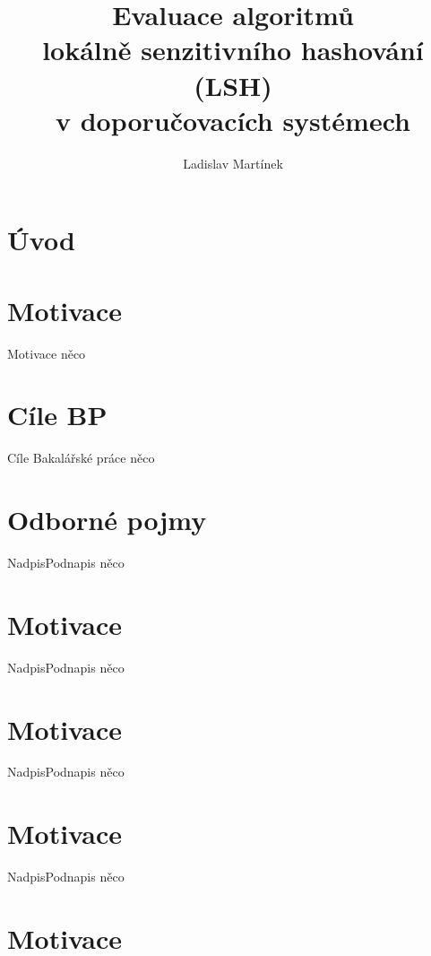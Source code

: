\documentclass[aspectratio=169,28pt]{beamer}
\title{Evaluace algoritmů\\ lokálně senzitivního hashování (LSH)\\ v doporučovacích systémech}
\author{Ladislav Martínek}
\begin{document}
\section{Úvod}
\begin{frame}
\titlepage
\end{frame}

\section{Motivace}
\begin{frame}{Motivace}
		něco
\end{frame}

\section{Cíle BP}
\begin{frame}{Cíle Bakalářské práce}
		něco
\end{frame}

\section{Odborné pojmy}
\begin{frame}{Nadpis}{Podnapis}
		něco
\end{frame}

\section{Motivace}

\begin{frame}{Nadpis}{Podnapis}
		něco
\end{frame}

\section{Motivace}

\begin{frame}{Nadpis}{Podnapis}
		něco
\end{frame}

\section{Motivace}

\begin{frame}{Nadpis}{Podnapis}
		něco
\end{frame}

\section{Motivace}
\end{document}
